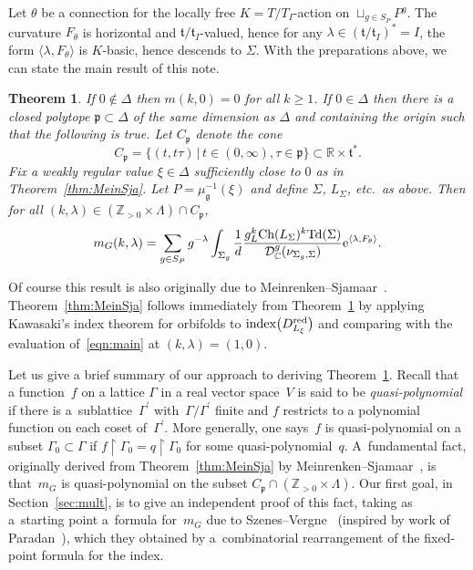 \documentclass[pdftex]{sigma}
\numberwithin{equation}{section}
\newtheorem{Theorem}{Theorem}[section]
\newcommand{\pair}[2]{\langle #1, #2 \rangle}
\newcommand{\tn}[1]{\textnormal{#1}}
\def\g{\ensuremath{\mathfrak{g}}}
\def\t{\ensuremath{\mathfrak{t}}}
\def\p{\ensuremath{\mathfrak{p}}}
\def\bC{\ensuremath{\mathbb{C}}}
\def\bR{\ensuremath{\mathbb{R}}}
\def\bZ{\ensuremath{\mathbb{Z}}}
\def\index{\ensuremath{\textnormal{index}}}
\def\Ch{\ensuremath{\textnormal{Ch}}}
\def\Td{\ensuremath{\textnormal{Td}}}
\def\calDC{\ensuremath{\mathcal{D}_{\bC}}}
\begin{document}
Let $\theta$ be a connection for the locally free $K=T/T_I$-action on $\sqcup_{g \in S_P}P^g$. The curvature $F_\theta$ is horizontal and $\t/\t_I$-valued, hence for any $\lambda \in (\t/\t_I)^\ast=I$, the form $\pair{\lambda}{F_\theta}$ is $K$-basic, hence descends to $\Sigma$. With the preparations above, we can state the main result of this note.
\begin{Theorem}\label{thm:main}If $0 \notin \Delta$ then $m(k,0)=0$ for all $k \ge 1$. If $0 \in \Delta$ then there is a closed polytope $\p \subset \Delta$ of the same dimension as $\Delta$ and containing the origin such that the following is true. Let $C_\p$ denote the cone
\[ C_\p=\{(t,t\tau)\,|\,t \in (0,\infty), \tau \in \p \} \subset \bR \times \t^\ast.\]
Fix a weakly regular value $\xi \in \Delta$ sufficiently close to $0$ as in Theorem~{\rm \ref{thm:MeinSja}}. Let $P=\mu_\g^{-1}(\xi)$ and define $\Sigma$, $L_\Sigma$, etc.\ as above. Then for all $(k,\lambda) \in (\bZ_{>0}\times \Lambda)\cap C_\p$,
\begin{gather}\label{eqn:main}
m_G(k,\lambda)=\sum_{g \in S_P} g^{-\lambda} \int_{\Sigma_g} \frac{1}{d}\frac{g_L^k\Ch(L_\Sigma)^k\Td(\Sigma)}{\calDC^g(\nu_{\Sigma_g,\Sigma})}{\rm e}^{\pair{\lambda}{F_\theta}}.
\end{gather}
\end{Theorem}
Of course this result is also originally due to Meinrenken--Sjamaar~\cite{MeinrenkenSjamaar}. Theorem~\ref{thm:MeinSja} follows immediately from Theorem~\ref{thm:main} by applying Kawasaki's index theorem for orbifolds to $\index\big(D^{\tn{red}}_{L_\xi}\big)$ and comparing with the evaluation of~\eqref{eqn:main} at $(k,\lambda)=(1,0)$.

Let us give a brief summary of our approach to deriving Theorem~\ref{thm:main}. Recall that a func\-tion~$f$ on a lattice $\Gamma$ in a real vector space~$V$ is said to be \emph{quasi-polynomial} if there is a~sublattice~$\Gamma^\prime$ with~$\Gamma/\Gamma^\prime$ finite and $f$ restricts to a polynomial function on each coset of~$\Gamma^\prime$. More generally, one says~$f$ is quasi-polynomial on a subset $\Gamma_0 \subset \Gamma$ if $f\upharpoonright \Gamma_0=q\upharpoonright \Gamma_0$ for some quasi-polynomial~$q$. A~fundamental fact, originally derived from Theorem~\ref{thm:MeinSja} by Meinrenken--Sjamaar~\cite{MeinrenkenSjamaar}, is that~$m_G$ is quasi-polynomial on the subset $C_\p \cap (\bZ_{>0}\times \Lambda)$. Our first goal, in Section~\ref{sec:mult}, is to give an independent proof of this fact, taking as a~starting point a~formula for~$m_G$ due to Szenes--Vergne~\cite{SzenesVergne2010} (inspired by work of Paradan~\cite{ParadanRiemannRoch}), which they obtained by a~combinatorial rearrangement of the fixed-point formula for the index.
\end{document}
